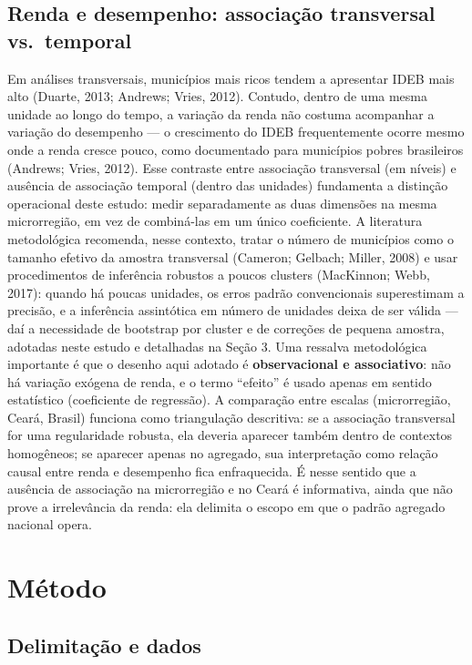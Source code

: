 \documentclass[12pt,a4paper]{article}
\begin{document}
\subsection{Renda e desempenho: associação transversal vs.\ temporal}

Em análises transversais, municípios mais ricos tendem a apresentar IDEB mais alto (Duarte, 2013; Andrews; Vries, 2012). Contudo, dentro de uma mesma unidade ao longo do tempo, a variação da renda não costuma acompanhar a variação do desempenho --- o crescimento do IDEB frequentemente ocorre mesmo onde a renda cresce pouco, como documentado para municípios pobres brasileiros (Andrews; Vries, 2012). Esse contraste entre associação transversal (em níveis) e ausência de associação temporal (dentro das unidades) fundamenta a distinção operacional deste estudo: medir separadamente as duas dimensões na mesma microrregião, em vez de combiná-las em um único coeficiente. A literatura metodológica recomenda, nesse contexto, tratar o número de municípios como o tamanho efetivo da amostra transversal (Cameron; Gelbach; Miller, 2008) e usar procedimentos de inferência robustos a poucos clusters (MacKinnon; Webb, 2017): quando há poucas unidades, os erros padrão convencionais superestimam a precisão, e a inferência assintótica em número de unidades deixa de ser válida --- daí a necessidade de bootstrap por cluster e de correções de pequena amostra, adotadas neste estudo e detalhadas na Seção 3.
Uma ressalva metodológica importante é que o desenho aqui adotado é \textbf{observacional e associativo}: não há variação exógena de renda, e o termo ``efeito'' é usado apenas em sentido estatístico (coeficiente de regressão). A comparação entre escalas (microrregião, Ceará, Brasil) funciona como triangulação descritiva: se a associação transversal for uma regularidade robusta, ela deveria aparecer também dentro de contextos homogêneos; se aparecer apenas no agregado, sua interpretação como relação causal entre renda e desempenho fica enfraquecida. É nesse sentido que a ausência de associação na microrregião e no Ceará é informativa, ainda que não prove a irrelevância da renda: ela delimita o escopo em que o padrão agregado nacional opera.


\section{Método}

\subsection{Delimitação e dados}
\end{document}
